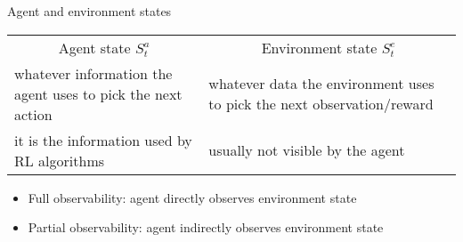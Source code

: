 \bgroup
{\renewcommand{\arraystretch}{2} 
\begin{frame}{Agent and environment states}
\centering
\begin{tabular}{l|l}
\multicolumn{1}{c|}{Agent state $S_t^a$}&
\multicolumn{1}{c}{Environment state $S_t^e$}\\
\multicolumn{1}{p{6cm}|}{whatever information the agent uses to pick the next action}&
\multicolumn{1}{p{6cm}}{whatever data the environment uses to pick the next observation/reward}\\
\multicolumn{1}{p{6cm}|}{it is the information used by RL algorithms}&
\multicolumn{1}{p{6cm}}{usually not visible by the agent}
\end{tabular}
\begin{itemize}
\item \textcolor{mImagelabRed}{Full observability}: agent directly observes environment state
\item \textcolor{mImagelabRed}{Partial observability}: agent indirectly observes environment state
\end{itemize}
\end{frame}
\egroup